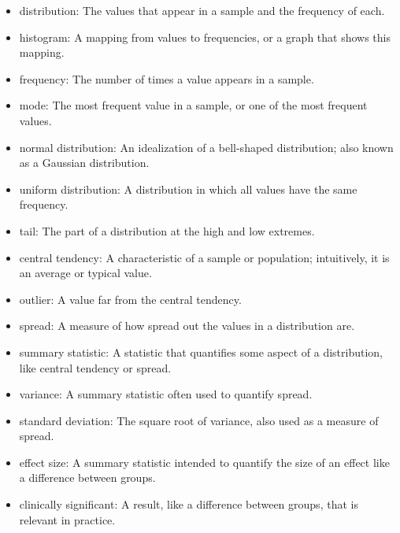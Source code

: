 \documentclass[12pt]{book}
\begin{document}
\begin{itemize}

\item distribution: The values that appear in a sample
and the frequency of each.

\item histogram: A mapping from values to frequencies, or a graph
that shows this mapping.

\item frequency: The number of times a value appears in a sample.

\item mode: The most frequent value in a sample, or one of the
most frequent values.

\item normal distribution: An idealization of a bell-shaped distribution;
also known as a Gaussian distribution. 

\item uniform distribution: A distribution in which all values have
the same frequency.

\item tail: The part of a distribution at the high and low extremes.

\item central tendency: A characteristic of a sample or population;
intuitively, it is an average or typical value. 

\item outlier: A value far from the central tendency.

\item spread: A measure of how spread out the values in a distribution
are.

\item summary statistic: A statistic that quantifies some aspect
of a distribution, like central tendency or spread.

\item variance: A summary statistic often used to quantify spread.

\item standard deviation: The square root of variance, also used
as a measure of spread.

\item effect size: A summary statistic intended to quantify the size
of an effect like a difference between groups.

\item clinically significant: A result, like a difference between groups,
that is relevant in practice.

\end{itemize}
\end{document}
